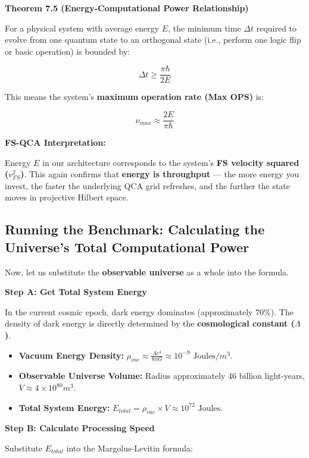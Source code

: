 \textbf{Theorem 7.5 (Energy-Computational Power Relationship)}

For a physical system with average energy \textbf{$E$}, the minimum time \textbf{$\Delta t$} required to evolve from one quantum state to an orthogonal state (i.e., perform one logic flip or basic operation) is bounded by:

$$\Delta t \ge \frac{\pi \hbar}{2E}$$

This means the system's \textbf{maximum operation rate (Max OPS)} is:

$$\nu_{max} \approx \frac{2E}{\pi \hbar}$$

\textbf{FS-QCA Interpretation:}

Energy \textbf{$E$} in our architecture corresponds to the system's \textbf{FS velocity squared ($v_{FS}^2$)}. This again confirms that \textbf{energy is throughput} --- the more energy you invest, the faster the underlying QCA grid refreshes, and the further the state moves in projective Hilbert space.

\subsection{Running the Benchmark: Calculating the Universe's Total Computational Power}

Now, let us substitute the \textbf{observable universe} as a whole into the formula.

\textbf{Step A: Get Total System Energy}

In the current cosmic epoch, dark energy dominates (approximately 70\%). The density of dark energy is directly determined by the \textbf{cosmological constant ($\Lambda$)}.

\begin{itemize}
\item \textbf{Vacuum Energy Density:} $\rho_{vac} \approx \frac{\Lambda c^4}{8 \pi G} \approx 10^{-9} \text{ Joules}/m^3$.

\item \textbf{Observable Universe Volume:} Radius approximately 46 billion light-years, $V \approx 4 \times 10^{80} m^3$.

\item \textbf{Total System Energy:} $E_{total} = \rho_{vac} \times V \approx 10^{72} \text{ Joules}$.
\end{itemize}

\textbf{Step B: Calculate Processing Speed}

Substitute $E_{total}$ into the Margolus-Levitin formula:

